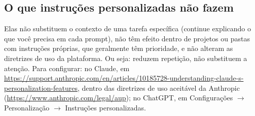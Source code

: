 \documentclass[11pt,a4paper]{article}
\begin{document}
\subsection*{O que instruções personalizadas não fazem}
Elas não substituem o contexto de uma tarefa específica (continue explicando o que você precisa em cada prompt), não têm efeito dentro de projetos ou pastas com instruções próprias, que geralmente têm prioridade, e não alteram as diretrizes de uso da plataforma. Ou seja: reduzem repetição, não substituem a atenção. Para configurar: no Claude, em \url{https://support.anthropic.com/en/articles/10185728-understanding-claude-s-personalization-features}, dentro das diretrizes de uso aceitável da Anthropic (\url{https://www.anthropic.com/legal/aup}); no ChatGPT, em Configurações $\rightarrow$ Personalização $\rightarrow$ Instruções personalizadas.

\clearpage
\end{document}
